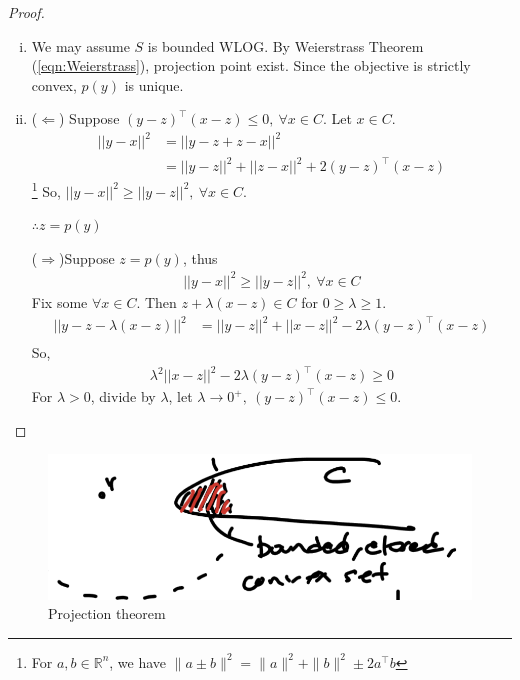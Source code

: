 \documentclass[11pt]{article}
\numberwithin{equation}{section}
\begin{document}
\begin{proof}
    \begin{enumerate}[i)]
        \item We may assume $S$ is bounded WLOG. By Weierstrass Theorem (\ref{eqn:Weierstrass}), projection point exist. Since the objective is strictly convex, $p(y)$ is unique.
        \item ($\Longleftarrow$) Suppose $(y-z)^\top (x - z)\leq 0, \ \forall x \in C$. Let $x \in C$.
        \begin{align*}
            ||y-x||^2 &= ||y-z+z-x||^2 \\
            &= ||y-z||^2 + ||z-x||^2 + 2(y-z)^\top (x - z) 
        \end{align*}\footnote{For $a,b\in \mathbb{R}^n$, we have $\|a \pm b\|^{2}=\| a \|^{2}+\| b \|^{2} \pm 2 a^{\top} b$}
        So, $||y-x||^2 \geq ||y-z||^2, \ \forall x \in C$.

        $\therefore z=p(y)$

        ($\Longrightarrow$)Suppose $z=p(y)$, thus \begin{align*}
            ||y-x||^2 \geq ||y-z||^2, \ \forall x \in C
        \end{align*} 
        Fix some $\forall x \in C$. Then $z+\lambda(x-z)\in C$ for $0\geq \lambda \geq 1$.
        \begin{align*}
            ||y-z-\lambda(x-z)||^2 &= ||y-z||^2+||x-z||^2 -2\lambda (y-z)^\top (x - z)\\
        \end{align*}
        So, \begin{align*}
            \lambda^2||x-z||^2 -2\lambda (y-z)^\top (x - z)\geq 0
        \end{align*} 
        For $\lambda > 0$, divide by $\lambda$, let $\lambda \rightarrow 0^+, \ (y-z)^\top (x - z)\leq 0$.
    \end{enumerate}
\end{proof}

\begin{figure}[ht]
    \centering
    \includegraphics[scale = 0.5]{images/3-pr-1.png}
    \caption{Projection theorem}
\end{figure}
\end{document}
